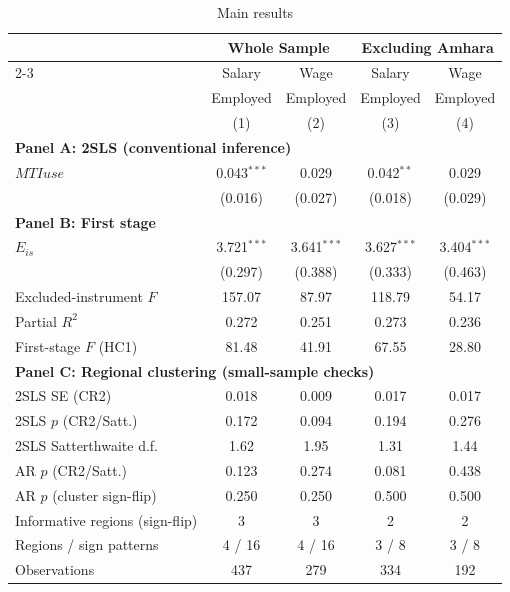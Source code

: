 \begin{table}[!htbp] \centering
\linespread{1}\selectfont
\caption{Main results} \label{tab:mainreg}
\begin{threeparttable}
\small
\begin{tabular}{@{\extracolsep{5pt}}lcccc}
\hline\hline
 & \multicolumn{2}{c}{\textbf{Whole Sample}} & \multicolumn{2}{c}{\textbf{Excluding Amhara}} \\
\cline{2-3} \cline{4-5}
 & Salary & Wage & Salary & Wage \\
 & Employed & Employed & Employed & Employed \\
 & (1) & (2) & (3) & (4) \\
\hline
\multicolumn{5}{l}{\textbf{Panel A: 2SLS (conventional inference)}} \\
$MTIuse$ & 0.043$^{***}$ & 0.029 & 0.042$^{**}$ & 0.029 \\
 & (0.016) & (0.027) & (0.018) & (0.029) \\
\hline
\multicolumn{5}{l}{\textbf{Panel B: First stage}} \\
$E_{is}$ & 3.721$^{***}$ & 3.641$^{***}$ & 3.627$^{***}$ & 3.404$^{***}$ \\
 & (0.297) & (0.388) & (0.333) & (0.463) \\
Excluded-instrument $F$ & 157.07 & 87.97 & 118.79 & 54.17 \\
Partial $R^2$ & 0.272 & 0.251 & 0.273 & 0.236 \\
First-stage $F$ (HC1) & 81.48 & 41.91 & 67.55 & 28.80 \\
\hline
\multicolumn{5}{l}{\textbf{Panel C: Regional clustering (small-sample checks)}} \\
2SLS SE (CR2) & 0.018 & 0.009 & 0.017 & 0.017 \\
2SLS $p$ (CR2/Satt.) & 0.172 & 0.094 & 0.194 & 0.276 \\
2SLS Satterthwaite d.f. & 1.62 & 1.95 & 1.31 & 1.44 \\
AR $p$ (CR2/Satt.) & 0.123 & 0.274 & 0.081 & 0.438 \\
AR $p$ (cluster sign-flip) & 0.250 & 0.250 & 0.500 & 0.500 \\
Informative regions (sign-flip) & 3 & 3 & 2 & 2 \\
Regions / sign patterns & 4 / 16 & 4 / 16 & 3 / 8 & 3 / 8 \\
\hline
Observations & 437 & 279 & 334 & 192 \\
\hline\hline
\end{tabular}

\end{threeparttable}
\end{table}
